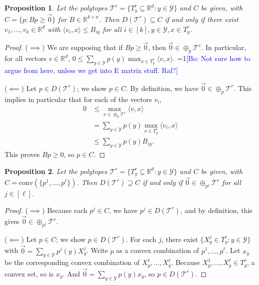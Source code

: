 \documentclass[12pt]{article}
\newcommand{\Comments}{1}
\newcommand{\mynote}[2]{\ifnum\Comments=1\textcolor{#1}{#2}\fi}
\newcommand{\bo}[1]{\mynote{blue}{[Bo: #1]}}
\newcommand{\reals}{\mathbb{R}}
\newcommand{\T}{\mathcal{T}}
\newcommand{\Y}{\mathcal{Y}}
\newcommand{\inprod}[2]{\langle #1, #2 \rangle}%
\newcommand{\conv}{\mathrm{conv}}
\newtheorem{proposition}{Proposition}
\begin{document}
  \begin{proposition} \label{prop:halfspace-opt}
    Let the polytopes $\T^r = \{T^r_y \subseteq \reals^d : y \in \Y\}$ and $C$ be given, with $C = \{p: Bp \geq \vec 0\}$ for $B \in \reals^{k \times n}$.
    Then $D(\T^r) \subseteq C$ if and only if there exist $v_1,\dots,v_k \in \reals^d$ with $\inprod{v_i}{x} \leq B_{iy}$ for all $i \in [k], y \in \Y, x \in T^r_y$.
  \end{proposition}
  \begin{proof}
    ($\implies$)
    We are supposing that if $Bp \geq \vec{0}$, then $\vec{0} \in \oplus_p \T^r$.
    In particular, for all vectors $v \in \reals^d$, $0 \leq \sum_{y \in \Y} p(y) \max_{x \in T^r_y} \inprod{v}{x}$.
    \bo{Not sure how to argue from here, unless we get into E matrix stuff. Raf?}

    ($\impliedby$)
    Let $p \in D(\T^r)$; we show $p \in C$.
    By definition, we have $\vec{0} \in \oplus_p \T^r$.
    This implies in particular that for each of the vectors $v_i$,
    \begin{align*}
      0 &\leq \max_{x \in \oplus_p \T^r} \inprod{v}{x}  \\
        &=    \sum_{y \in \Y} p(y) \max_{x \in T^r_y} \inprod{v_i}{x}  \\
        &\leq \sum_{y \in \Y} p(y) B_{iy} .
    \end{align*}
    This proves $Bp \geq 0$, so $p \in C$.
  \end{proof}
  
  \begin{proposition} \label{prop:vertex-opt}
    Let the polytopes $\T^r = \{T^r_y \subseteq \reals^d : y \in \Y\}$ and $C$ be given, with $C = \conv(\{p^1,\ldots,p^{\ell}\})$.
    Then $D(\T^r) \supseteq C$ if and only if $\vec 0 \in \oplus_{p^j} \T^r$ for all $j \in [\ell]$.
  \end{proposition}
  \begin{proof}
    ($\implies$)
    Because each $p^j \in C$, we have $p^j \in D(\T^r)$, and by definition, this gives $\vec{0} \in \oplus_{p^j} \T^r$.
    
    ($\impliedby$)
    Let $p \in C$; we show $p \in D(\T^r)$.
    For each $j$, there exist $\{X^j_y \in T^r_y : y \in \Y\}$ with $\vec{0} = \sum_{y \in \Y} p^j(y) X^j_y$.
    Write $p$ as a convex combination of $p^1,\ldots,p^{\ell}$.
    Let $x_y$ be the corresponding convex combination of $X^1_y,\ldots,X^{\ell}_y$.
    Because $X^1_y,\ldots,X^{\ell}_y \in T^r_y$, a convex set, so is $x_y$.
    And $\vec{0} = \sum_{y \in \Y} p(y) x_y$, so $p \in D(\T^r)$.
  \end{proof}
\end{document}
